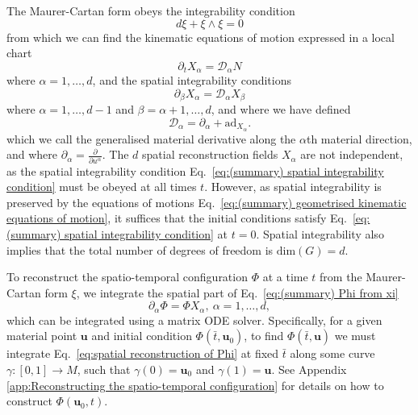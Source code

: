 The Maurer-Cartan form obeys the integrability condition
\begin{equation}
d \xi + \xi \wedge \xi = 0
\end{equation}
from which we can find the kinematic equations of motion expressed in a local chart
\begin{equation} \label{eq:(summary) geometrised kinematic equations of motion}
\partial_t X_\alpha  = \mathcal{D}_\alpha N
\end{equation}
where $\alpha = 1, \dots, d$, and the spatial integrability conditions
\begin{equation} \label{eq:(summary) spatial integrability condition}
\partial_\beta X_\alpha = \mathcal{D}_\alpha X_\beta
\end{equation}
where $\alpha = 1, \dots, d-1$ and $\beta = \alpha+1, \dots, d$, and where we have defined
\begin{equation}
\mathcal{D}_\alpha = \partial_{\alpha} + \text{ad}_{X_\alpha}.
\end{equation}
which we call the generalised material derivative along the $\alpha$th material direction, and where $\partial_\alpha = \frac{\partial}{\partial u^\alpha}$. The $d$ spatial reconstruction fields $X_\alpha$ are not independent, as the spatial integrability condition Eq.~\ref{eq:(summary) spatial integrability condition} must be obeyed at all times $t$. However, as spatial integrability is preserved by the equations of motions Eq.~\ref{eq:(summary) geometrised kinematic equations of motion}, it suffices that the initial conditions satisfy Eq.~\ref{eq:(summary) spatial integrability condition} at $t=0$. Spatial integrability also implies that the total number of degrees of freedom is $\text{dim}(G) = d$.

To reconstruct the spatio-temporal configuration $\Phi$ at a time $t$ from the Maurer-Cartan form $\xi$, we integrate the spatial part of Eq.~\ref{eq:(summary) Phi from xi}
\begin{equation} \label{eq:spatial reconstruction of Phi}
	\partial_\alpha \Phi = \Phi X_\alpha,\ \alpha = 1,\dots, d,
\end{equation}
which can be integrated using a matrix ODE solver. Specifically, for a given material point $\mathbf{u}$ and initial condition $\Phi(\bar{t}, \mathbf{u}_0)$, to find $\Phi(\bar{t}, \mathbf{u})$ we must integrate Eq.~\ref{eq:spatial reconstruction of Phi} at fixed $\bar{t}$ along some curve $\gamma : [0,1] \to M$, such that $\gamma(0) = \mathbf{u}_0$ and $\gamma(1) = \mathbf{u}$. See Appendix \ref{app:Reconstructing the spatio-temporal configuration} for details on how to construct $\Phi(\mathbf{u}_0, t)$.

